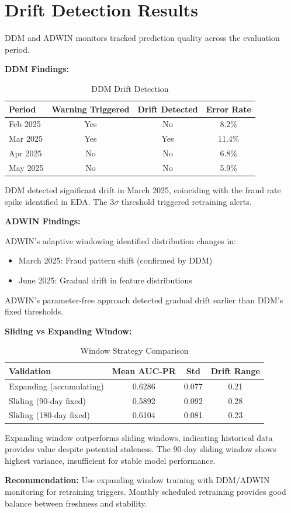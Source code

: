 \section{Drift Detection Results}
\label{sec:5_6}

DDM and ADWIN monitors tracked prediction quality across the evaluation period.

\textbf{DDM Findings:}

\begin{table}[htbp]
    \centering
    \caption{DDM Drift Detection}
    \label{tab:5_7}
    \begin{tabular}{lccc}
        \toprule
        Period & Warning Triggered & Drift Detected & Error Rate \\
        \midrule
        Feb 2025 & Yes & No & 8.2\% \\
        Mar 2025 & Yes & Yes & 11.4\% \\
        Apr 2025 & No & No & 6.8\% \\
        May 2025 & No & No & 5.9\% \\
        \bottomrule
    \end{tabular}
\end{table}

DDM detected significant drift in March 2025, coinciding with the fraud rate spike identified in EDA. The 3$\sigma$ threshold triggered retraining alerts.

\textbf{ADWIN Findings:}

ADWIN's adaptive windowing identified distribution changes in:
\begin{itemize}
    \item March 2025: Fraud pattern shift (confirmed by DDM)
    \item June 2025: Gradual drift in feature distributions
\end{itemize}

ADWIN's parameter-free approach detected gradual drift earlier than DDM's fixed thresholds.

\textbf{Sliding vs Expanding Window:}

\begin{table}[htbp]
    \centering
    \caption{Window Strategy Comparison}
    \label{tab:5_8}
    \begin{tabular}{lccc}
        \toprule
        Validation & Mean AUC-PR & Std & Drift Range \\
        \midrule
        Expanding (accumulating) & 0.6286 & 0.077 & 0.21 \\
        Sliding (90-day fixed) & 0.5892 & 0.092 & 0.28 \\
        Sliding (180-day fixed) & 0.6104 & 0.081 & 0.23 \\
        \bottomrule
    \end{tabular}
\end{table}

Expanding window outperforms sliding windows, indicating historical data provides value despite potential staleness. The 90-day sliding window shows highest variance, insufficient for stable model performance.

\textbf{Recommendation:} Use expanding window training with DDM/ADWIN monitoring for retraining triggers. Monthly scheduled retraining provides good balance between freshness and stability.
